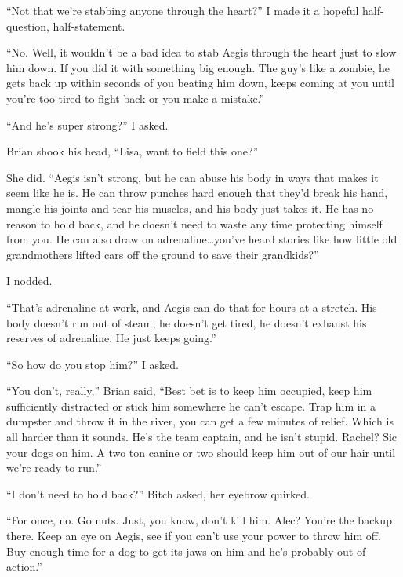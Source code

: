``Not that we're stabbing anyone through the heart?'' I made it a hopeful half-question, half-statement.



``No.  Well, it wouldn't be a bad idea to stab Aegis through the heart just to slow him down.  If you did it with something big enough.  The guy's like a zombie, he gets back up within seconds of you beating him down, keeps coming at you until you're too tired to fight back or you make a mistake.''



``And he's super strong?'' I asked.



Brian shook his head, ``Lisa, want to field this one?''



She did.  ``Aegis isn't strong, but he can abuse his body in ways that makes it seem like he is.  He can throw punches hard enough that they'd break his hand, mangle his joints and tear his muscles, and his body just takes it.  He has no reason to hold back, and he doesn't need to waste any time protecting himself from you. He can also draw on adrenaline\ldots you've heard stories like how little old grandmothers lifted cars off the ground to save their grandkids?''



I nodded.



``That's adrenaline at work, and Aegis can do that for hours at a stretch.  His body doesn't run out of steam, he doesn't get tired, he doesn't exhaust his reserves of adrenaline.  He just keeps going.''



``So how do you stop him?'' I asked.



``You don't, really,'' Brian said, ``Best bet is to keep him occupied, keep him sufficiently distracted or stick him somewhere he can't escape.  Trap him in a dumpster and throw it in the river, you can get a few minutes of relief. Which is all harder than it sounds.  He's the team captain, and he isn't stupid.  Rachel?  Sic your dogs on him.  A two ton canine or two should keep him out of our hair until we're ready to run.''



``I don't need to hold back?'' Bitch asked, her eyebrow quirked.



``For once, no.  Go nuts.  Just, you know, don't kill him.  Alec?  You're the backup there.  Keep an eye on Aegis, see if you can't use your power to throw him off.  Buy enough time for a dog to get its jaws on him and he's probably out of action.''



